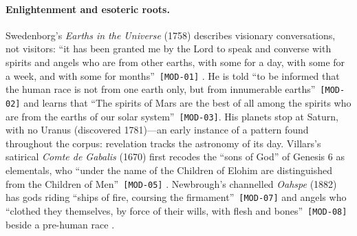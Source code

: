 \documentclass[11pt,a4paper]{article}
\newcommand{\pid}[1]{\texttt{\small #1}}
\begin{document}
\paragraph{Enlightenment and esoteric roots.} Swedenborg's \emph{Earths in the Universe} (1758) describes visionary conversations, not visitors: \enquote{it has been granted me by the Lord to speak and converse with spirits and angels who are from other earths, with some for a day, with some for a week, and with some for months}~\pid{[MOD-01]} \parencite{swedenborg1758earths}. He is told \enquote{to be informed that the human race is not from one earth only, but from innumerable earths}~\pid{[MOD-02]} and learns that \enquote{The spirits of Mars are the best of all among the spirits who are from the earths of our solar system}~\pid{[MOD-03]}. His planets stop at Saturn, with no Uranus (discovered 1781)---an early instance of a pattern found throughout the corpus: revelation tracks the astronomy of its day. Villars's satirical \emph{Comte de Gabalis} (1670) first recodes the ``sons of God'' of Genesis 6 as elementals, who \enquote{under the name of the Children of Elohim are distinguished from the Children of Men}~\pid{[MOD-05]} \parencite{villars1670}. Newbrough's channelled \emph{Oahspe} (1882) has gods riding \enquote{ships of fire, coursing the firmament}~\pid{[MOD-07]} and angels who \enquote{clothed they themselves, by force of their wills, with flesh and bones}~\pid{[MOD-08]} beside a pre-human race \parencite{newbrough1882oahspe}.
\end{document}
